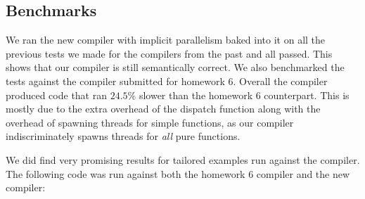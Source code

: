 \documentclass{acm_proc_article-sp}
\begin{document}
\subsection*{Benchmarks}
We ran the new compiler with implicit parallelism baked into it on all the previous tests we made for
the compilers from the past and all passed. This shows that our compiler is still semantically correct.
We also benchmarked the tests against the compiler submitted for homework 6. Overall the compiler produced
code that ran $24.5\%$ slower than the homework 6 counterpart. This is mostly due to the extra overhead
of the dispatch function along with the overhead of spawning threads for simple functions, as our compiler
indiscriminately spawns threads for \emph{all} pure functions.

We did find very promising results for tailored examples run against the compiler. The following code was
run against both the homework 6 compiler and the new compiler:
\end{document}

